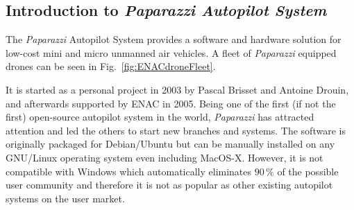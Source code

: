 \subsection{Introduction to \emph{Paparazzi Autopilot System}}

The \emph{Paparazzi} Autopilot System provides a software and hardware solution for low-cost mini and micro unmanned air vehicles. 
A fleet of \emph{Paparazzi} equipped drones can be seen in Fig.~\ref{fig:ENACdroneFleet}.

It is started as a personal project in 2003 by Pascal Brisset and Antoine Drouin, and afterwards supported by ENAC in 2005. 
Being one of the first (if not the first) open-source autopilot system in the world, \emph{Paparazzi} has attracted attention and led the others to start new branches and systems. %
The software is originally packaged for Debian/Ubuntu but can be manually installed on any GNU/Linux operating system even including MacOS-X. 
However, it is not compatible with Windows which automatically eliminates $90\,\%$ of the possible user community and therefore it is not as popular as other existing autopilot systems on the user market.



